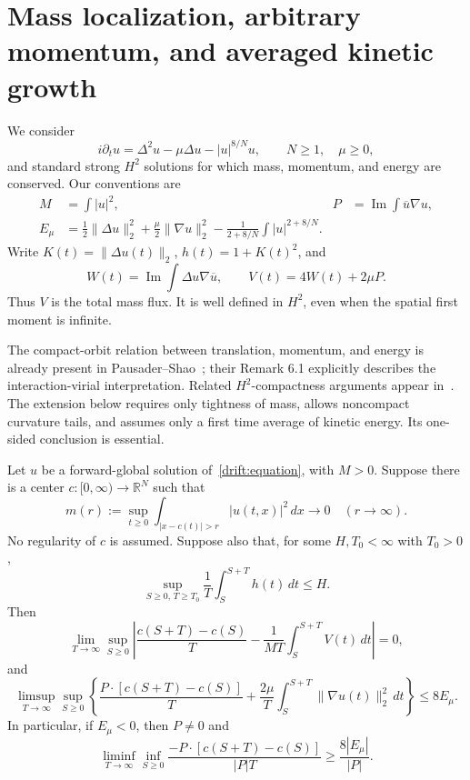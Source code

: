 \section{Mass localization, arbitrary momentum, and averaged kinetic growth}

We consider
\begin{equation}\label{drift:equation}
 i\partial_tu=\Delta^2u-\mu\Delta u-|u|^{8/N}u,
 \qquad N\ge1,\quad \mu\ge0,
\end{equation}
and standard strong $H^2$ solutions for which mass, momentum, and energy are conserved. Our conventions are
\begin{align*}
 M&=\int |u|^2, & P&=\operatorname{Im}\int\overline u\nabla u,\\
 E_\mu&=\frac12\|\Delta u\|_2^2+\frac\mu2\|\nabla u\|_2^2
       -\frac1{2+8/N}\int|u|^{2+8/N}.
\end{align*}
Write $K(t)=\|\Delta u(t)\|_2$, $h(t)=1+K(t)^2$, and
\[
 W(t)=\operatorname{Im}\int\Delta u\nabla\overline u,
 \qquad V(t)=4W(t)+2\mu P.
\]
Thus $V$ is the total mass flux. It is well defined in $H^2$, even when the spatial first moment is infinite.

The compact-orbit relation between translation, momentum, and energy is already present in Pausader--Shao~\cite[Propositions 6.1--6.2]{PS}; their Remark 6.1 explicitly describes the interaction-virial interpretation. Related $H^2$-compactness arguments appear in~\cite[Proposition 5.2]{Komada}. The extension below requires only tightness of mass, allows noncompact curvature tails, and assumes only a first time average of kinetic energy. Its one-sided conclusion is essential.

\begin{theorem}\label{drift:main}
Let $u$ be a forward-global solution of~\eqref{drift:equation}, with $M>0$. Suppose there is a center $c:[0,\infty)\to\mathbb R^N$ such that
\begin{equation}\label{drift:tight}
 m(r):=\sup_{t\ge0}\int_{|x-c(t)|>r}|u(t,x)|^2\,dx\longrightarrow0
 \quad(r\to\infty).
\end{equation}
No regularity of $c$ is assumed. Suppose also that, for some $H,T_0<\infty$ with $T_0>0$,
\begin{equation}\label{drift:budget}
 \sup_{S\ge0,\,T\ge T_0}\frac1T\int_S^{S+T}h(t)\,dt\le H.
\end{equation}
Then
\begin{equation}\label{drift:current}
 \lim_{T\to\infty}\sup_{S\ge0}
 \left|\frac{c(S+T)-c(S)}T
       -\frac1{MT}\int_S^{S+T}V(t)\,dt\right|=0,
\end{equation}
and
\begin{equation}\label{drift:inequality}
 \limsup_{T\to\infty}\sup_{S\ge0}
 \left\{\frac{P\cdot[c(S+T)-c(S)]}T
       +\frac{2\mu}T\int_S^{S+T}\|\nabla u(t)\|_2^2\,dt\right\}
 \le8E_\mu.
\end{equation}
In particular, if $E_\mu<0$, then $P\ne0$ and
\[
 \liminf_{T\to\infty}\inf_{S\ge0}
 \frac{-P\cdot[c(S+T)-c(S)]}{|P|T}
 \ge\frac{8|E_\mu|}{|P|}.
\]
\end{theorem}

